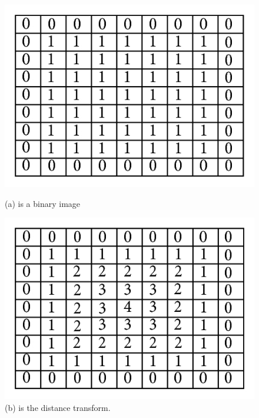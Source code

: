 \documentclass[a4paper]{article}
\begin{document}
\begin{figure}[h!]
 \begin{center}
\begin{minipage}[b]{0.4\textwidth}
  \includegraphics[scale=1.5]{fig4_a}
  \caption{(a) is a binary image}
  \label{fig:binary image}
 \end{minipage}
   \hfill
 \begin{minipage}[b]{0.4\textwidth}
  \includegraphics[scale=1.5]{fig4_b}
  \caption{(b) is the distance transform.}
  \label{fig:distance transform}
 \end{minipage}

 \end{center}
\end{figure}
\end{document}
